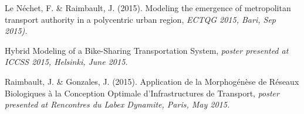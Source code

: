 \bigskip

\noindent Le Néchet, F. \& Raimbault, J. (2015). Modeling the emergence of metropolitan transport authority in a polycentric urban region, \textit{ECTQG 2015, Bari, Sep 2015).}


\bigskip

\noindent Hybrid Modeling of a Bike-Sharing Transportation System, \textit{poster presented at ICCSS 2015, Helsinki, June 2015.}

\bigskip

\noindent Raimbault, J. \& Gonzales, J. (2015). Application de la Morphog{\'e}n{\`e}se de R{\'e}seaux Biologiques {\`a} la Conception Optimale d'Infrastructures de Transport, \textit{poster presented at Rencontres du Labex Dynamite, Paris, May 2015.}


